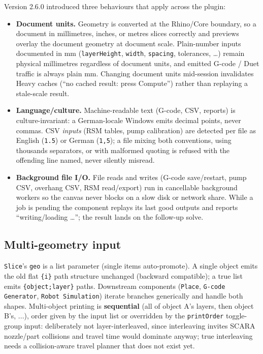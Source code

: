 \documentclass[11pt]{article}
\newcommand{\param}[1]{\texttt{#1}}
\begin{document}
Version 2.6.0 introduced three behaviours that apply across the plugin:

\begin{itemize}
  \item \textbf{Document units.} Geometry is converted at the Rhino/Core
  boundary, so a document in millimetres, inches, or metres slices
  correctly and previews overlay the document geometry at document
  scale. Plain-number inputs documented in mm (\param{layerHeight},
  \param{width}, \param{spacing}, tolerances, \ldots) remain physical
  millimetres regardless of document units, and emitted G-code /
  Duet traffic is always plain mm. Changing document units
  mid-session invalidates Heavy caches (``no cached result: press
  Compute'') rather than replaying a stale-scale result.
  \item \textbf{Language/culture.} Machine-readable text (G-code,
  CSV, reports) is culture-invariant: a German-locale Windows
  emits decimal points, never commas. CSV \emph{inputs} (RSM tables,
  pump calibration) are detected per file as English (\texttt{1.5}) or
  German (\texttt{1,5}); a file mixing both conventions, using thousands
  separators, or with malformed quoting is refused with the offending
  line named, never silently misread.
  \item \textbf{Background file I/O.} File reads and writes (G-code
  save/restart, pump CSV, overhang CSV, RSM read/export) run in
  cancellable background workers so the canvas never
  blocks on a slow disk or network share. While a job is pending the
  component replays its last good outputs and reports
  ``writing/loading \ldots''; the result lands on the follow-up solve.
\end{itemize}

\subsection{Multi-geometry input}

\param{Slice}'s \param{geo} is a list parameter (single items
auto-promote). A single object emits the old flat \texttt{\{i\}} path
structure unchanged (backward compatible); a true list emits
\texttt{\{object;layer\}} paths. Downstream components (\param{Place},
\param{G-code Generator}, \param{Robot Simulation}) iterate branches generically and handle
both shapes. Multi-object printing is \textbf{sequential} (all of object
A's layers, then object B's, ...), order given by the input list or
overridden by the \param{printOrder} toggle-group input: deliberately
not layer-interleaved, since interleaving invites SCARA nozzle/part
collisions and travel time would dominate anyway; true interleaving
needs a collision-aware travel planner that does not exist yet.
\end{document}
